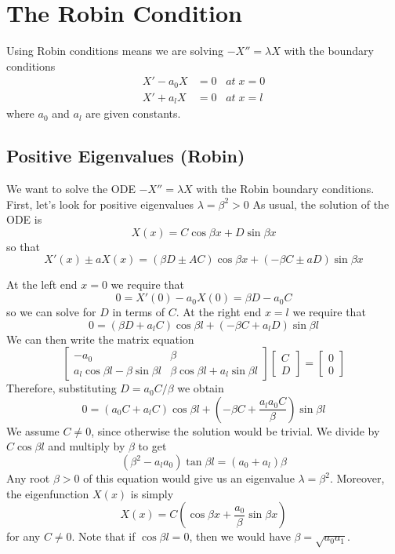 \documentclass[12pt, a4paper, oneside, openright, titlepage]{book}
\begin{document}
\section{The Robin Condition}


Using Robin conditions means we are solving $-X'' = \lambda X$ with the boundary conditions \begin{align}
    X' -a_0X &= 0\;\;\;at\;x=0 \\
    X'+a_lX &= 0 \;\;\;at\;x=l
\end{align}
where $a_0$ and $a_l$ are given constants.

\subsection{Positive Eigenvalues (Robin)}

We want to solve the ODE $-X'' = \lambda X$ with the Robin boundary conditions. First, let's look for positive eigenvalues $\lambda = \beta^2 > 0$ As usual, the solution of the ODE is $$X(x) = C\cos\beta x+D\sin\beta x$$ so that $$X'(x)\pm aX(x) = (\beta D\pm AC)\cos\beta x+(-\beta C\pm aD)\sin\beta x$$

At the left end $x = 0$ we require that \begin{equation*}
    0 = X'(0) - a_0X(0) = \beta D-a_0C
\end{equation*}
so we can solve for $D$ in terms of $C$. At the right end $x = l$ we require that \begin{equation*}
    0 = (\beta D+a_lC)\cos\beta l + (-\beta C+a_lD)\sin\beta l
\end{equation*}
We can then write the matrix equation \begin{equation*}
    \begin{bmatrix} -a_0 & \beta \\ a_l\cos\beta l - \beta\sin\beta l & \beta\cos\beta l + a_l\sin\beta l \end{bmatrix}\begin{bmatrix}C \\ D \end{bmatrix} = \begin{bmatrix} 0 \\ 0 \end{bmatrix}
\end{equation*}
Therefore, substituting $D = a_0C/\beta$ we obtain \begin{equation*}
    0 = (a_0C+a_lC)\cos\beta l+\left(-\beta C+\frac{a_la_0C}{\beta}\right)\sin\beta l
\end{equation*}
We assume $C \neq 0$, since otherwise the solution would be trivial. We divide by $C\cos\beta l$ and multiply by $\beta$ to get \begin{equation*}
    (\beta^2-a_la_0)\tan\beta l = (a_0+a_l)\beta
\end{equation*}
Any root $\beta > 0$ of this equation would give us an eigenvalue $\lambda = \beta^2$. Moreover, the eigenfunction $X(x)$ is simply \begin{equation*}
    X(x) = C\left(\cos\beta x+\frac{a_0}{\beta}\sin\beta x\right)
\end{equation*}
for any $C \neq 0$. Note that if $\cos\beta l = 0$, then we would have $\beta = \sqrt{a_0a_1}$.
\end{document}
